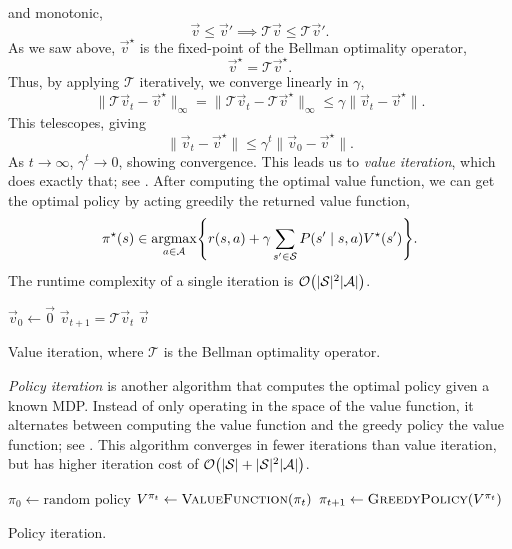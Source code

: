 and monotonic, \[
    \vec{v} \leq \vec{v}' \implies \mathcal{T}\vec{v} \leq \mathcal{T} \vec{v}'.
\]
As we saw above, $\vec{v}^\star$ is the fixed-point of the Bellman optimality operator, \[
    \vec{v}^\star = \mathcal{T} \vec{v}^\star.
\]
Thus, by applying $\mathcal{T}$ iteratively, we converge linearly in $\gamma$, \[
    \| \mathcal{T} \vec{v}_t - \vec{v}^\star \|_{\infty} = \| \mathcal{T} \vec{v}_t - \mathcal{T} \vec{v}^\star \|_{\infty} \leq \gamma \| \vec{v}_t - \vec{v}^\star \|.
\]
This telescopes, giving \[
    \| \vec{v}_t - \vec{v}^\star \| \leq \gamma^t \| \vec{v}_0 - \vec{v}^\star \|.
\]
As $t \to \infty$, $\gamma^t \to 0$, showing convergence. This leads us to \textit{value
    iteration}, which does exactly that; see . After computing the optimal
value function, we can get the optimal policy by acting greedily \wrt the returned value function, \[
    \pi^\star(s) \in \argmax_{a \in \mathcal{A}} \lft\{ r(s,a) + \gamma \sum_{s' \in \mathcal{S}} P(s' \mid s, a) V^\star(s') \rgt\}.
\]
The runtime complexity of a single iteration is $\bigo{|\mathcal{S}|^2 |\mathcal{A}|}$.

\begin{algorithm}
    \begin{algorithmic}[1]
        \State $\vec{v}_0 \gets \vec{0}$
        \State $\vec{v}_{t+1} = \mathcal{T} \vec{v}_t$
        \EndWhile
        \State \Return $\vec{v}$
    \end{algorithmic}
    \caption{Value iteration, where $\mathcal{T}$ is the Bellman optimality operator.}
    \label{alg:value-iteration}
\end{algorithm}

\textit{Policy iteration} is another algorithm that computes the optimal policy given a known MDP.
Instead of only operating in the space of the value function, it alternates between computing the
value function and the greedy policy \wrt the value function; see . This
algorithm converges in fewer iterations than value iteration, but has higher iteration cost of
$\bigo{|\mathcal{S}| + |\mathcal{S}|^2|\mathcal{A}|}$.

\begin{algorithm}
    \begin{algorithmic}[1]
        \State $\pi_0 \gets \text{random policy}$
        \State $V^{\pi_t} \gets \Call{ValueFunction}{\pi_t}$ 
        \State $\pi_{t+1} \gets \Call{GreedyPolicy}{V^{\pi_t}}$ 
        \EndWhile
    \end{algorithmic}
    \caption{Policy iteration.}
    \label{alg:policy-iteration}
\end{algorithm}

